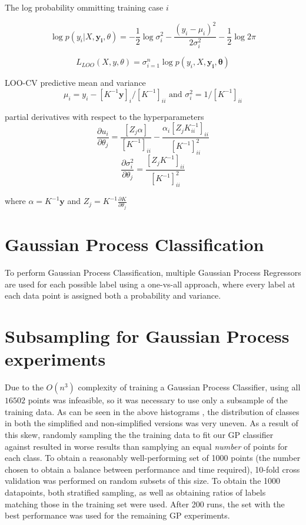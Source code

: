 The log probability ommitting training case $i$

$$\log p(y_i|X, \mathbf{y_i}, \theta) = -\frac{1}{2}\log\sigma^2_i - \frac{(y_i - \mu_i)^2}{2 \sigma^2_i} - \frac{1}{2}\log2\pi$$

$$ L_{LOO}(X, y, \theta) = \sigma^n_{i=1} \log p(y_i, X, \mathbf{y_i}, \mathbf{\theta})$$

LOO-CV predictive mean and variance
$$\mu_i= y_i - [K^{-1}\mathbf{y}]_i / [K^{-1}]_{ii} \text{ and } \sigma_i^2 = 1/[K^{-1}]_{ii}$$

partial derivatives with respect to the hyperparameters
$$\frac{\partial{u_i}}{\partial{\theta_j}} = \frac{[Z_j \alpha]}{[K^{-1}]_{ii}} - \frac{\alpha_i[Z_j K^{-1}_{ii}]_{ii}}{[K^{-1}]^2_{ii}}$$
$$\frac{\partial{\sigma_i^2}}{\partial{\theta_j}} = \frac{[Z_jK^{-1}]_{ii}}{[K^{-1}]^2_{ii}}$$

where $\alpha = K^{-1}\mathbf{y}$ and $Z_j = K^{-1} \frac{\partial{K}}{\partial{\theta_j}}$


\section{Gaussian Process Classification}

To perform Gaussian Process Classification, multiple Gaussian Process Regressors are used for each possible label using a one-vs-all approach, where every label at each data point is assigned both a probability and variance.


\section{Subsampling for Gaussian Process experiments}

Due to the $O(n^3)$ complexity of training a Gaussian Process Classifier, using all $16502$ points was infeasible, so it was necessary to use only a subsample of the training data. As can be seen in the above histograms , the distribution of classes in both the simplified and non-simplified versions was very uneven. As a result of this skew, randomly sampling the the training data to fit our GP classifier against resulted in worse results than samplying an equal \textit{number} of points for each class. To obtain a reasonably well-performing set of 1000 points (the number chosen to obtain a balance between performance and time required), 10-fold cross validation was performed on random subsets of this size. To obtain the 1000 datapoints, both stratified sampling, as well as obtaining ratios of labels matching those in the training set were used. After 200 runs, the set with the best performance was used for the remaining GP experiments.


